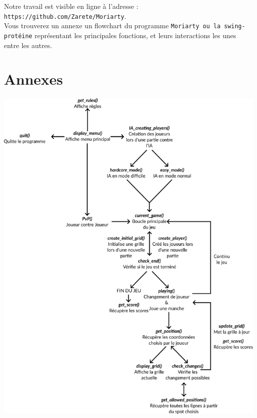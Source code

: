 Notre travail est visible en ligne à l'adresse : \verb|https://github.com/Zarete/Moriarty|.\\

Vous trouverez un annexe un flowchart du programme \verb|Moriarty ou la swing-protéine| représentant les principales fonctions, et leurs interactions les unes entre les autres.

\section{Annexes}

\includegraphics[scale=0.7]{flow.eps}


